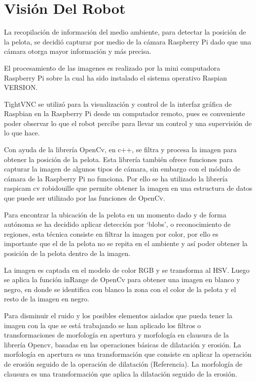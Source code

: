 \chapter{Visión Del Robot}\label{chapter:vision_del_robot}


La recopilación de información del medio ambiente, para detectar la posición de la pelota, se decidió capturar por medio de la cámara Raspberry Pi dado que una cámara otorga mayor información y más precisa. 

El procesamiento de las imagenes es realizado por la mini computadora Raspberry Pi sobre la cual ha sido instalado el sistema operativo Raspian VERSION.

TightVNC se utilizó para la visualización y control de la interfaz gráfica de Raspbian en la Raspberry Pi desde un computador remoto, pues es conveniente poder observar lo que el robot percibe para llevar un control y una supervisión de lo que hace.

Con ayuda de la librería OpenCv, en c++, se filtra y procesa la imagen para obtener la posición de la pelota. Esta librería también ofrece funciones para capturar la imagen de algunos tipos de cámara, sin embargo con el módulo de cámara de la Raspberry Pi no funciona. Por ello se ha utilizado la librería raspicam cv robidouille que permite obtener la imagen en una estructura de datos que puede ser utilizado por las funciones de OpenCv. 

Para encontrar la ubicación de la pelota en un momento dado y de forma autónoma se ha decidido aplicar detección por ‘blobs’, o reconocimiento de regiones, esta técnica consiste en filtrar la imagen por color, por ello es importante que el de la pelota no se repita en el ambiente y así poder obtener la posición de la pelota dentro de la imagen.

La imagen es captada en el modelo de color RGB y se transforma al HSV. Luego se aplica la función inRange de OpenCv para obtener una imagen en blanco y negro, en donde se identifica con blanco la zona con el color de la pelota y el resto de la imagen en negro. 

Para disminuir el ruido y los posibles elementos aislados que pueda tener la imagen con la que se está trabajando se han aplicado los filtros o transformaciones de morfología en apertura y morfología en clausura de la librería Opencv, basadas en las operaciones básicas de dilatación y erosión. La morfología en apertura es una transformación que consiste en aplicar la operación de erosión seguido de la operación de dilatación (Referencia). La morfología de clausura es una transformación que aplica la dilatación seguido de la erosión.

